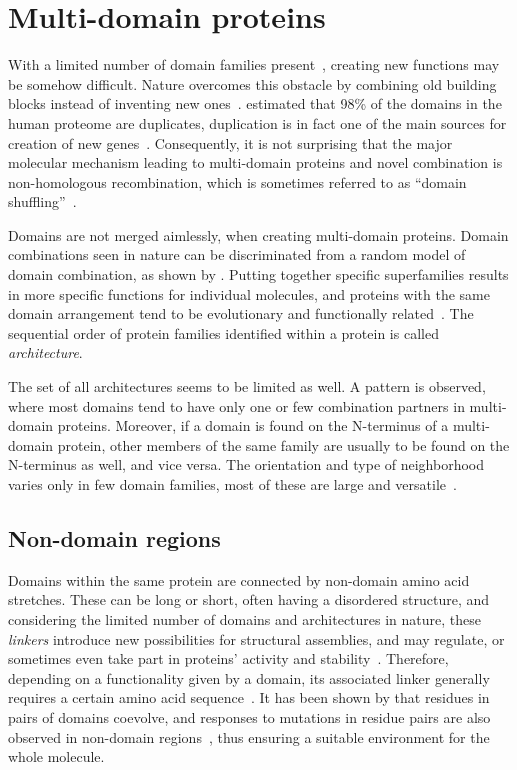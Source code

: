 \section*{Multi-domain proteins}
\label{intro:multi}

  With a limited number of domain families
  present~\cite{chothia1992one, wolf2000estimating}, creating new functions may be somehow
  difficult.
  Nature overcomes this obstacle by combining old building blocks instead of inventing new
  ones~\cite{apic2001insight}.
  \citet{muller2002structural} estimated that 98\% of the domains in the human proteome
  are duplicates, duplication is in fact one of the main sources for creation of new
  genes~\cite{lynch2000evolutionary}.
  Consequently, it is not surprising that the major molecular mechanism leading to
  multi-domain proteins and novel combination is non-homologous recombination, which is
  sometimes referred to as ``domain shuffling''~\cite{vogel2004structure}.

  Domains are not merged aimlessly, when creating multi-domain proteins.
  Domain combinations seen in nature can be discriminated from a random model of domain
  combination, as shown by \citet{apic2003multi}.
  Putting together specific superfamilies results in more specific functions for
  individual molecules, and proteins with the same domain arrangement tend to be
  evolutionary and functionally
  related~\cite{hegyi2001annotation, bashton2002geometry, vogel2004structure}.
  The sequential order of protein families identified within a protein is called
  \emph{architecture}.

  The set of all architectures seems to be limited as well.
  A pattern is observed, where most domains tend to have only one or few
  combination partners in multi-domain proteins.
  Moreover, if a domain is found on the N-terminus of a multi-domain protein, other
  members of the same family are usually to be found on the N-terminus as well, and vice
  versa.
  The orientation and type of neighborhood varies only in few domain families, most of
  these are large and versatile~\cite{apic2001domain, apic2001insight}.

\subsection*{Non-domain regions}
\label{intro:linker}

  Domains within the same protein are connected by non-domain amino acid stretches.
  These can be long or short, often having a disordered structure, and considering the
  limited number of domains and architectures in nature, these \emph{linkers} introduce
  new possibilities for structural assemblies, and may regulate, or sometimes even take
  part in proteins' activity and stability~\cite{papaleo2016role}.
  Therefore, depending on a functionality given by a domain, its associated linker
  generally requires a certain amino acid sequence~\cite{gokhale2000role}.
  It has been shown by \citet{jakubec2018widespread} that residues in pairs of domains
  coevolve, and responses to mutations in residue pairs are also observed in non-domain
  regions~\cite{smock2010interdomain}, thus ensuring a suitable environment for the whole
  molecule.

